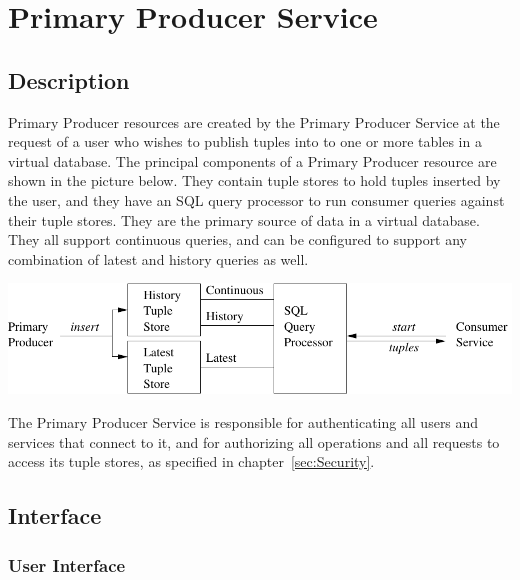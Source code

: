\section{Primary Producer Service}\label{sec:PrimaryProducer}

\subsection{Description}

Primary Producer resources are created by the Primary Producer Service
at the request of a user who wishes to publish tuples into to one or
more tables in a virtual database.
The principal components of a
Primary Producer resource are shown in the picture below. They contain
tuple stores to hold tuples inserted by the user,
and they have an SQL query processor to run consumer queries against
their tuple stores. They are the primary source of data in a virtual
database. They all support continuous queries, and can be configured
to support any combination of latest and history queries as well.

\begin{center}
\includegraphics[width=145mm]{pp_detail}
\end{center}

The Primary Producer Service is responsible for authenticating all users and
services that connect to it, and for authorizing all operations and all requests
to access its tuple stores, as specified in chapter~\ref{sec:Security}.

\subsection{Interface}

\subsubsection{User Interface}

